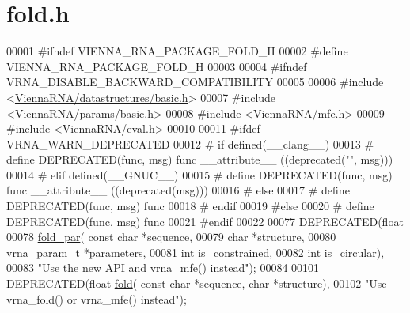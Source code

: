 \hypertarget{fold_8h_source}{}\section{fold.\+h}
\label{fold_8h_source}

\begin{DoxyCode}
00001 \textcolor{preprocessor}{#ifndef VIENNA\_RNA\_PACKAGE\_FOLD\_H}
00002 \textcolor{preprocessor}{#define VIENNA\_RNA\_PACKAGE\_FOLD\_H}
00003 
00004 \textcolor{preprocessor}{#ifndef VRNA\_DISABLE\_BACKWARD\_COMPATIBILITY}
00005 
00006 \textcolor{preprocessor}{#include <\hyperlink{datastructures_2basic_8h}{ViennaRNA/datastructures/basic.h}>}
00007 \textcolor{preprocessor}{#include <\hyperlink{params_2basic_8h}{ViennaRNA/params/basic.h}>}
00008 \textcolor{preprocessor}{#include <\hyperlink{mfe_8h}{ViennaRNA/mfe.h}>}
00009 \textcolor{preprocessor}{#include <\hyperlink{eval_8h}{ViennaRNA/eval.h}>}
00010 
00011 \textcolor{preprocessor}{#ifdef VRNA\_WARN\_DEPRECATED}
00012 \textcolor{preprocessor}{# if defined(\_\_clang\_\_)}
00013 \textcolor{preprocessor}{#  define DEPRECATED(func, msg) func \_\_attribute\_\_ ((deprecated("", msg)))}
00014 \textcolor{preprocessor}{# elif defined(\_\_GNUC\_\_)}
00015 \textcolor{preprocessor}{#  define DEPRECATED(func, msg) func \_\_attribute\_\_ ((deprecated(msg)))}
00016 \textcolor{preprocessor}{# else}
00017 \textcolor{preprocessor}{#  define DEPRECATED(func, msg) func}
00018 \textcolor{preprocessor}{# endif}
00019 \textcolor{preprocessor}{#else}
00020 \textcolor{preprocessor}{# define DEPRECATED(func, msg) func}
00021 \textcolor{preprocessor}{#endif}
00022 
00077 DEPRECATED(\textcolor{keywordtype}{float}
00078 \hyperlink{group__mfe__global__deprecated_ga2bc41df5d71fee6fd8da9904ee65d8fb}{fold\_par}( \textcolor{keyword}{const} \textcolor{keywordtype}{char} *sequence,
00079           \textcolor{keywordtype}{char} *structure,
00080           \hyperlink{group__energy__parameters_structvrna__param__s}{vrna\_param\_t} *parameters,
00081           \textcolor{keywordtype}{int} is\_constrained,
00082           \textcolor{keywordtype}{int} is\_circular),
00083 \textcolor{stringliteral}{"Use the new API and vrna\_mfe() instead"});
00084 
00101 DEPRECATED(\textcolor{keywordtype}{float} \hyperlink{group__mfe__global__deprecated_gaadafcb0f140795ae62e5ca027e335a9b}{fold}( \textcolor{keyword}{const} \textcolor{keywordtype}{char} *sequence, \textcolor{keywordtype}{char} *structure),
00102 \textcolor{stringliteral}{"Use vrna\_fold() or vrna\_mfe() instead"});

\end{DoxyCode}
